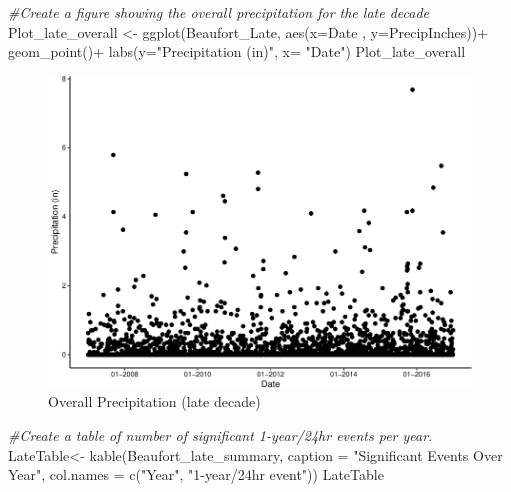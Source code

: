 \documentclass[
  12pt,
]{article}
\newenvironment{Shaded}{\begin{snugshade}}{\end{snugshade}}
\newcommand{\AttributeTok}[1]{\textcolor[rgb]{0.77,0.63,0.00}{#1}}
\newcommand{\CommentTok}[1]{\textcolor[rgb]{0.56,0.35,0.01}{\textit{#1}}}
\newcommand{\FunctionTok}[1]{\textcolor[rgb]{0.00,0.00,0.00}{#1}}
\newcommand{\NormalTok}[1]{#1}
\newcommand{\OtherTok}[1]{\textcolor[rgb]{0.56,0.35,0.01}{#1}}
\newcommand{\SpecialCharTok}[1]{\textcolor[rgb]{0.00,0.00,0.00}{#1}}
\newcommand{\StringTok}[1]{\textcolor[rgb]{0.31,0.60,0.02}{#1}}
\begin{document}
\begin{Shaded}
\begin{Highlighting}[]
\CommentTok{\#Create a figure showing the overall precipitation for the late decade}
\NormalTok{Plot\_late\_overall }\OtherTok{\textless{}{-}} \FunctionTok{ggplot}\NormalTok{(Beaufort\_Late, }\FunctionTok{aes}\NormalTok{(}\AttributeTok{x=}\NormalTok{Date , }\AttributeTok{y=}\NormalTok{PrecipInches))}\SpecialCharTok{+}
  \FunctionTok{geom\_point}\NormalTok{()}\SpecialCharTok{+}
  \FunctionTok{labs}\NormalTok{(}\AttributeTok{y=}\StringTok{"Precipitation (in)"}\NormalTok{, }\AttributeTok{x=} \StringTok{"Date"}\NormalTok{)}
\NormalTok{Plot\_late\_overall}
\end{Highlighting}
\end{Shaded}

\begin{figure}
\centering
\includegraphics{Final_Project_Thornton_Katayama_Ngenzi_files/figure-latex/late plot 2-1.pdf}
\caption{Overall Precipitation (late decade)}
\end{figure}

\begin{Shaded}
\begin{Highlighting}[]
\CommentTok{\#Create a table of number of significant 1{-}year/24hr events per year.}
\NormalTok{LateTable}\OtherTok{\textless{}{-}} \FunctionTok{kable}\NormalTok{(Beaufort\_late\_summary, }
                  \AttributeTok{caption =} \StringTok{"Significant Events Over Year"}\NormalTok{, }
                  \AttributeTok{col.names =} \FunctionTok{c}\NormalTok{(}\StringTok{"Year"}\NormalTok{, }\StringTok{"1{-}year/24hr event"}\NormalTok{))}
\NormalTok{LateTable}
\end{Highlighting}
\end{Shaded}
\end{document}
